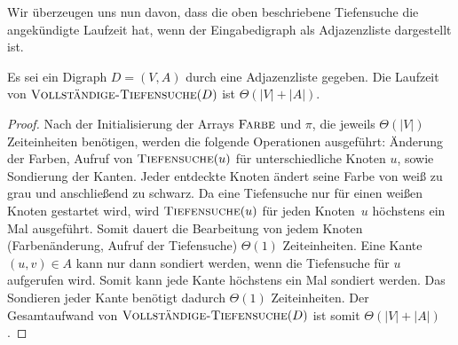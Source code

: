 
Wir überzeugen uns nun davon, dass die oben beschriebene Tiefensuche die angekündigte Laufzeit hat, wenn der Eingabedigraph als Adjazenzliste dargestellt ist.

\begin{thm}
\label{thm:laufzeit-tiefensuche}
Es sei ein Digraph $D=(V,A)$ durch eine Adjazenzliste gegeben.
Die Laufzeit von $\mathop{\text{\textsc{Vollständige-Tiefensuche}}}(D)$ ist $\Theta(|V|+|A|)$.
\end{thm}

\begin{proof}
Nach der Initialisierung der Arrays $\mathop{\text{\textsc{Farbe}}}$ und $\pi$, die jeweils $\Theta(|V|)$ Zeiteinheiten benötigen, werden die folgende Operationen ausgeführt: Änderung der Farben, Aufruf von $\mathop{\text{\textsc{Tiefensuche}}}(u)$ für unterschiedliche Knoten $u$, sowie Sondierung der Kanten.
Jeder entdeckte Knoten ändert seine Farbe von weiß zu grau und anschließend zu schwarz.
Da eine Tiefensuche nur für einen weißen Knoten gestartet wird, wird $\mathop{\text{\textsc{Tiefensuche}}}(u)$ für jeden Knoten~$u$ höchstens ein Mal ausgeführt.
Somit dauert die Bearbeitung von jedem Knoten (Farbenänderung, Aufruf der Tiefensuche) $\Theta(1)$ Zeiteinheiten.
Eine Kante $(u,v) \in A$ kann nur dann sondiert werden, wenn die Tiefensuche für $u$ aufgerufen wird.
Somit kann jede Kante höchstens ein Mal sondiert werden.
Das Sondieren jeder Kante benötigt dadurch $\Theta(1)$ Zeiteinheiten.
Der Gesamtaufwand von $\mathop{\text{\textsc{Vollständige-Tiefensuche}}}(D)$ ist somit $\Theta(|V|+|A|)$. 
\end{proof}


